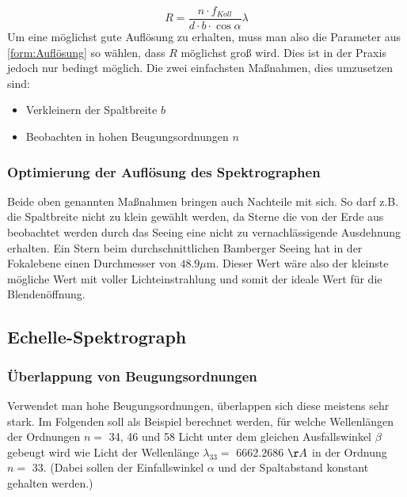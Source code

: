 \begin{equation}
R = \frac{n \cdot f_{Koll}}{d \cdot b \cdot \cos \alpha} \lambda
\label{form:Auflösung}
\end{equation}
Um eine möglichst gute Auflösung zu erhalten, muss man also die Parameter aus \eqref{form:Auflösung} so wählen, dass $ R $ möglichst groß wird. Dies ist in der Praxis jedoch nur bedingt möglich. Die zwei einfachsten Maßnahmen, dies umzusetzen sind:

\begin{itemize}

\item Verkleinern der Spaltbreite $ b $

\item Beobachten in hohen Beugungsordnungen $ n $

\end{itemize}

\subsubsection{Optimierung der Auflösung des Spektrographen}
Beide oben genannten Maßnahmen bringen auch Nachteile mit sich. So darf z.B. die Spaltbreite nicht zu klein gewählt werden, da Sterne die von der Erde aus beobachtet werden durch das Seeing eine nicht zu vernachlässigende Ausdehnung erhalten. Ein Stern beim durchschnittlichen Bamberger Seeing hat in der Fokalebene einen Durchmesser von $48.9 \mu \mathrm{m} $. Dieser Wert wäre also der kleinste mögliche Wert mit voller Lichteinstrahlung und somit der ideale Wert für die Blendenöffnung.

\subsection{Echelle-Spektrograph}
\subsubsection{Überlappung von Beugungsordnungen}
Verwendet man hohe Beugungsordnungen, überlappen sich diese meistens sehr stark. Im Folgenden soll als Beispiel berechnet werden, für welche Wellenlängen der Ordnungen $ n = $ 34, 46 und 58 Licht unter dem gleichen Ausfallswinkel  $ \beta $ gebeugt wird wie Licht der Wellenlänge $ \lambda_{33} = $ 6662.2686 $ \AA $ in der Ordnung $ n = $ 33. (Dabei sollen der Einfallswinkel $ \alpha $ und der Spaltabstand konstant gehalten werden.)\\

